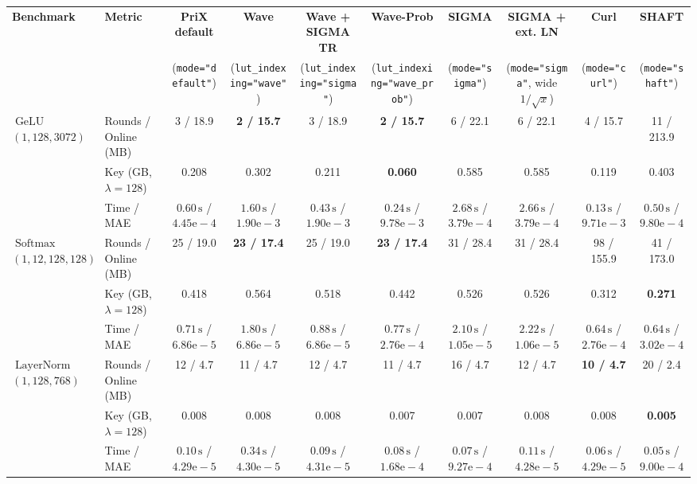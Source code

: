 \begin{tabular}{@{}llcccccccc@{}}
\toprule
\textbf{Benchmark} & \textbf{Metric} & \textbf{PriX default} & \textbf{Wave} & \textbf{Wave + SIGMA TR} & \textbf{Wave-Prob} & \textbf{SIGMA} & \textbf{SIGMA + ext. LN} & \textbf{Curl} & \textbf{SHAFT} \\
 & & (\texttt{mode="default"}) & (\texttt{lut\_indexing="wave"}) & (\texttt{lut\_indexing="sigma"}) & (\texttt{lut\_indexing="wave\_prob"}) & (\texttt{mode="sigma"}) & (\texttt{mode="sigma"}, wide $1/\sqrt{x}$) & (\texttt{mode="curl"}) & (\texttt{mode="shaft"}) \\
\midrule
\multirow{3}{*}{$\operatorname{GeLU}$ $(1,128,3072)$}
 & Rounds / Online (MB) & 3 / 18.9 & \textbf{2 / 15.7} & 3 / 18.9 & \textbf{2 / 15.7} & 6 / 22.1 & 6 / 22.1 & 4 / 15.7 & 11 / 213.9 \\
 & Key (GB, $\lambda{=}128$) & 0.208 & 0.302 & 0.211 & \textbf{0.060} & 0.585 & 0.585 & 0.119 & 0.403 \\
 & Time / MAE & $0.60\,\text{s}$ / $4.45\text{e}-4$ & $1.60\,\text{s}$ / $1.90\text{e}-3$ & $0.43\,\text{s}$ / $1.90\text{e}-3$ & $0.24\,\text{s}$ / $9.78\text{e}-3$ & $2.68\,\text{s}$ / $3.79\text{e}-4$ & $2.66\,\text{s}$ / $3.79\text{e}-4$ & $0.13\,\text{s}$ / $9.71\text{e}-3$ & $0.50\,\text{s}$ / $9.80\text{e}-4$ \\
\midrule
\multirow{3}{*}{$\operatorname{Softmax}$ $(1,12,128,128)$}
 & Rounds / Online (MB) & 25 / 19.0 & \textbf{23 / 17.4} & 25 / 19.0 & \textbf{23 / 17.4} & 31 / 28.4 & 31 / 28.4 & 98 / 155.9 & 41 / 173.0 \\
 & Key (GB, $\lambda{=}128$) & 0.418 & 0.564 & 0.518 & 0.442 & 0.526 & 0.526 & 0.312 & \textbf{0.271} \\
 & Time / MAE & $0.71\,\text{s}$ / $6.86\text{e}-5$ & $1.80\,\text{s}$ / $6.86\text{e}-5$ & $0.88\,\text{s}$ / $6.86\text{e}-5$ & $0.77\,\text{s}$ / $2.76\text{e}-4$ & $2.10\,\text{s}$ / $1.05\text{e}-5$ & $2.22\,\text{s}$ / $1.06\text{e}-5$ & $0.64\,\text{s}$ / $2.76\text{e}-4$ & $0.64\,\text{s}$ / $3.02\text{e}-4$ \\
\midrule
\multirow{3}{*}{$\operatorname{LayerNorm}$ $(1,128,768)$}
 & Rounds / Online (MB) & 12 / 4.7 & 11 / 4.7 & 12 / 4.7 & 11 / 4.7 & 16 / 4.7 & 12 / 4.7 & \textbf{10 / 4.7} & 20 / 2.4 \\
 & Key (GB, $\lambda{=}128$) & 0.008 & 0.008 & 0.008 & 0.007 & 0.007 & 0.008 & 0.008 & \textbf{0.005} \\
 & Time / MAE & $0.10\,\text{s}$ / $4.29\text{e}-5$ & $0.34\,\text{s}$ / $4.30\text{e}-5$ & $0.09\,\text{s}$ / $4.31\text{e}-5$ & $0.08\,\text{s}$ / $1.68\text{e}-4$ & $0.07\,\text{s}$ / $9.27\text{e}-4$ & $0.11\,\text{s}$ / $4.28\text{e}-5$ & $0.06\,\text{s}$ / $4.29\text{e}-5$ & $0.05\,\text{s}$ / $9.00\text{e}-4$ \\

\end{tabular}
